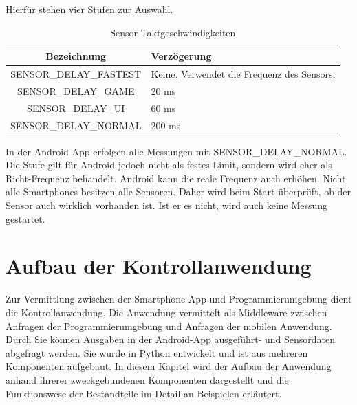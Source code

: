\documentclass[11pt,a4paper]{report}
\begin{document}
Hierfür stehen vier Stufen zur Auswahl.
\begin{table}[htbp]
  \centering
  \begin{tabular}{|c|p{4cm}|}
      \hline
      \textbf{Bezeichnung} & \textbf{Verzögerung} \\
	  \hline
      SENSOR\_DELAY\_FASTEST & Keine. Verwendet die Frequenz des Sensors.\\
      \hline
      SENSOR\_DELAY\_GAME & 20 ms\\
      \hline
      SENSOR\_DELAY\_UI & 60 ms\\
      \hline
      SENSOR\_DELAY\_NORMAL & 200 ms\\
      \hline
  \end{tabular}
  \caption{Sensor-Taktgeschwindigkeiten\cite{sensor-takt}}
  \label{tab:sensor_speeds}
\end{table}
In der Android-App erfolgen alle Messungen mit SENSOR\_DELAY\_NORMAL.
Die Stufe gilt für Android jedoch nicht als festes Limit, sondern wird eher als Richt-Frequenz behandelt.
Android kann die reale Frequenz auch erhöhen.
Nicht alle Smartphones besitzen alle Sensoren.
Daher wird beim Start überprüft, ob der Sensor auch wirklich vorhanden ist.
Ist er es nicht, wird auch keine Messung gestartet.

\chapter{Aufbau der Kontrollanwendung}\label{chap:server_software}
Zur Vermittlung zwischen der Smartphone-App und Programmierumgebung dient die Kontrollanwendung.
Die Anwendung vermittelt als Middleware zwischen Anfragen der Programmierumgebung und Anfragen der mobilen Anwendung.
Durch Sie können Ausgaben in der Android-App ausgeführt- und Sensordaten abgefragt werden.
Sie wurde in Python entwickelt und ist aus mehreren Komponenten aufgebaut.
In diesem Kapitel wird der Aufbau der Anwendung anhand ihrerer zweckgebundenen Komponenten dargestellt und die Funktionswese der Bestandteile im Detail an Beispielen erläutert.
\end{document}
